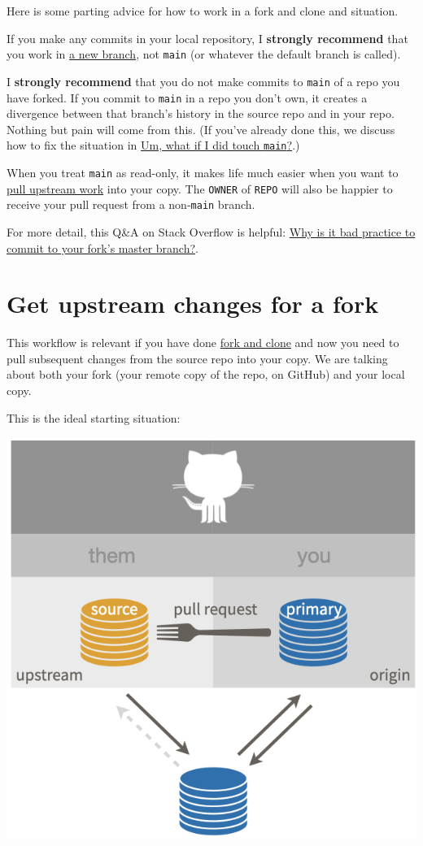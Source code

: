 \documentclass[
]{book}
\begin{document}
Here is some parting advice for how to work in a fork and clone and situation.

If you make any commits in your local repository, I \textbf{strongly recommend} that you work in \hyperref[git-branches]{a new branch}, not \texttt{main} (or whatever the default branch is called).

I \textbf{strongly recommend} that you do not make commits to \texttt{main} of a repo you have forked.
If you commit to \texttt{main} in a repo you don't own, it creates a divergence between that branch's history in the source repo and in your repo.
Nothing but pain will come from this.
(If you've already done this, we discuss how to fix the situation in \hyperref[touched-main]{Um, what if I did touch \texttt{main}?}.)

When you treat \texttt{main} as read-only, it makes life much easier when you want to \hyperref[upstream-changes]{pull upstream work} into your copy.
The \texttt{OWNER} of \texttt{REPO} will also be happier to receive your pull request from a non-\texttt{main} branch.

For more detail, this Q\&A on Stack Overflow is helpful: \href{https://stackoverflow.com/q/33749832}{Why is it bad practice to commit to your fork's master branch?}.

\chapter{Get upstream changes for a fork}\label{upstream-changes}

This workflow is relevant if you have done \hyperref[fork-and-clone]{fork and clone} and now you need to pull subsequent changes from the source repo into your copy.
We are talking about both your fork (your remote copy of the repo, on GitHub) and your local copy.

This is the ideal starting situation:

\begin{center}\includegraphics[width=0.6\linewidth]{img/fork-them-pull-request} \end{center}
\end{document}
